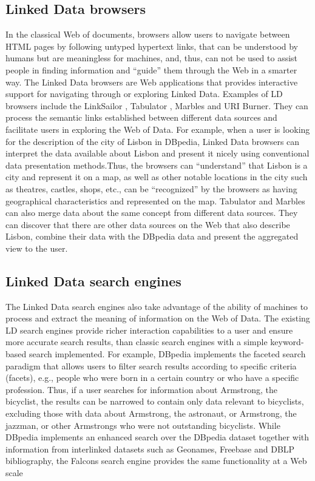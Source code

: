\documentclass[a4paper,12pt,oneside]{report}
\begin{document}
{{{\subsection{Linked Data browsers}
{In the classical Web of documents, browsers allow users to navigate between HTML pages by following untyped hypertext links, that can be understood by humans but are meaningless for machines, and, thus, can not be used to assist people in finding information and “guide” them through the Web in a smarter way. The Linked Data browsers are Web applications that provides interactive support for navigating through or exploring Linked Data. Examples of LD browsers include the LinkSailor , Tabulator , Marbles and URI Burner. They can process
the semantic links established between different data sources and facilitate users in exploring the Web of Data. For example, when a user is looking for the description of the city of Lisbon in DBpedia, Linked Data browsers can interpret the data available about Lisbon and present it nicely using conventional data presentation methods.Thus, the browsers can “understand” that Lisbon is a city and represent it on a map, as well as other notable locations in the city such as theatres, castles, shops, etc., can be “recognized” by the browsers as having geographical characteristics and represented on the map. Tabulator and Marbles can also merge data about the same concept from different data sources. They can discover that there are other data sources on the Web that also describe Lisbon, combine their data with the DBpedia data and present the aggregated view to the user.}
\subsection{Linked Data search engines}
{The Linked Data search engines also take advantage of the ability of machines to process and extract the meaning of information on the Web of Data. The existing LD search engines provide richer interaction capabilities to a user and ensure more accurate search results, than classic search engines with a simple keyword-based search implemented. For example, DBpedia implements the faceted search paradigm  that allows users to filter search results according to specific criteria (facets), e.g., people who were born in a certain country or who have a specific profession. Thus, if a user searches for information about Armstrong, the bicyclist, the results can be narrowed to contain only data relevant to bicyclists, excluding those with data about Armstrong, the astronaut, or Armstrong, the jazzman, or other Armstrongs who were not outstanding bicyclists. While DBpedia implements an enhanced search over the DBpedia dataset together with information from interlinked datasets such as Geonames, Freebase and DBLP bibliography, the Falcons search engine provides the same functionality at a Web scale}
}}}
\end{document}
